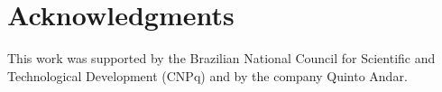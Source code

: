 \section{Acknowledgments}
This work was supported by the Brazilian National Council for Scientific and Technological Development (CNPq) and by the company Quinto Andar.
